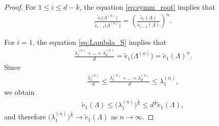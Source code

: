 \documentclass[pdftex]{sigma}
\numberwithin{equation}{section}
\begin{document}
\begin{proof}
For $1\le i \le d-k$, the equation \eqref{eq:symm_root} implies that
\begin{align}\label{eq:Lambda_S}
\frac{\widetilde{e}_{i}\big(\Lambda^{(n)}\big)}{\widetilde{e}_{i-1}\big(\Lambda^{(n)}\big)}= \left( \frac{\widetilde{e}_{i}(\Lambda)}{\widetilde{e}_{i-1}(\Lambda)}\right)^n.
\end{align}

For $i=1$, the equation \eqref{eq:Lambda_S} implies that
\begin{align*}
\frac{\lambda_{1}^{(n)}+\dots + \lambda_{d}^{(n)}}{d}=\widetilde{e}_1\big(\Lambda^{(n)}\big)=\widetilde{e}_1(\Lambda)^n.
\end{align*}
Since
\begin{align*}
\frac{\lambda_{1}^{(n)}}{d} \le \frac{\lambda_{1}^{(n)}+\dots + \lambda_{d}^{(n)}}{d} \le \lambda_{1}^{(n)},
\end{align*}
we obtain
\begin{align*}
\widetilde{e}_1(\Lambda) \le \big(\lambda_{1}^{(n)}\big)^{\frac{1}{n}} \le d^{\frac{1}{n}}\widetilde{e}_1(\Lambda),
\end{align*}
and therefore {$\big(\lambda_{1}^{(n)}\big)^{\frac{1}{n}} \rightarrow \widetilde{e}_1(\Lambda)$ as $n\rightarrow\infty$.}


\end{proof}
\end{document}

